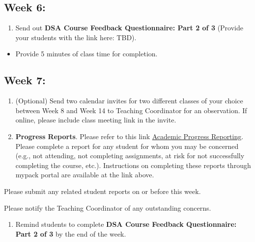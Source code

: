 \documentclass[
]{book}
\providecommand{\tightlist}{%
  \setlength{\itemsep}{0pt}\setlength{\parskip}{0pt}}
\begin{document}
\subsection{Week 6:}\label{week-6}

\begin{enumerate}
\def\labelenumi{\arabic{enumi})}
\tightlist
\item
  Send out { \textbf{DSA Course Feedback Questionnaire: Part 2 of 3} } (Provide your students with the link here: TBD).
\end{enumerate}

\begin{itemize}
\tightlist
\item
  Provide 5 minutes of class time for completion.
\end{itemize}

\subsection{Week 7:}\label{week-7}

\begin{enumerate}
\def\labelenumi{\arabic{enumi})}
\item
  (Optional) Send two calendar invites for two different classes of your choice between Week 8 and Week 14 to Teaching Coordinator for an observation. If online, please include class meeting link in the invite.
\item
  \textbf{Progress Reports}. Please refer to this link \href{https://dasa.ncsu.edu/faculty-resources/academic-progress-reporting/}{Academic Progress Reporting}. Please complete a report for any student for whom you may be concerned (e.g., not attending, not completing assignments, at risk for not successfully completing the course, etc.). Instructions on completing these reports through mypack portal are available at the link above.
\end{enumerate}

Please submit any related student reports on or before this week.

Please notify the Teaching Coordinator of any outstanding concerns.

\begin{enumerate}
\def\labelenumi{\arabic{enumi})}
\setcounter{enumi}{2}
\tightlist
\item
  Remind students to complete \textbf{DSA Course Feedback Questionnaire: Part 2 of 3} by the end of the week.
\end{enumerate}
\end{document}
